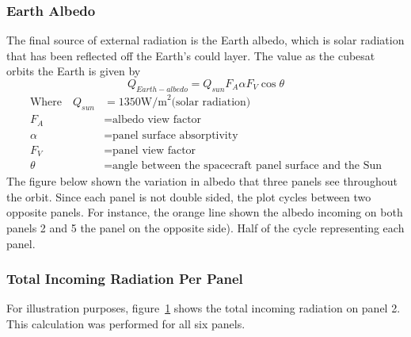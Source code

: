 \subsubsection{Earth Albedo}
The final source of external radiation is the Earth albedo, which is solar radiation that has been reflected off the Earth's could layer. The value as the cubesat orbits the Earth is given by
\begin{equation}
Q_{Earth-albedo} = Q_{sun} F_A \alpha F_V \cos\theta
\end{equation}
\vspace{-1cm}
\begin{align}
\text{Where}\quad Q_{sun} &= 1350 \text{W/m}^2\text{(solar radiation)} \nonumber\\
F_A &= \text{albedo view factor} \nonumber\\
\alpha &= \text{panel surface absorptivity} \nonumber\\
F_V &= \text{panel view factor} \nonumber\\
\theta & = \text{angle between the spacecraft panel surface and the Sun}
\end{align}
The figure below shown the variation in albedo that three panels see throughout the orbit. Since each panel is not double sided, the plot cycles between two opposite panels. For instance, the orange line shown the albedo incoming on both panels 2 and 5 the panel on the opposite side). Half of the cycle representing each panel.
\begin{figure}[H]
\end{figure}

\subsubsection{Total Incoming Radiation Per Panel}
For illustration purposes, figure~\ref{fig:Qtotal2} shows the total incoming radiation on panel 2. This calculation was performed for all six panels.
\begin{figure}[H]
    \label{fig:Qtotal2}
\end{figure}


